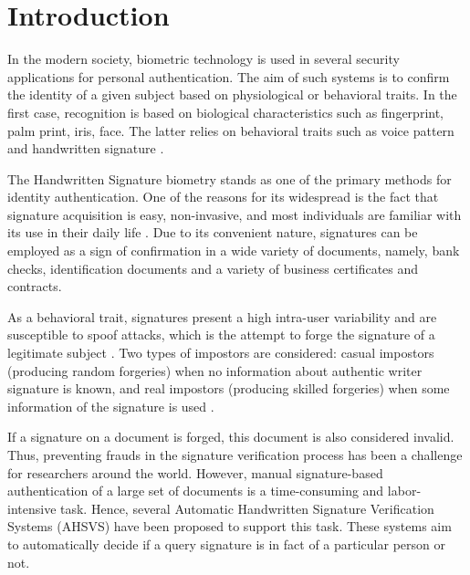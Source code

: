 
\chapter{Introduction}

In the modern society, biometric technology is used in several security applications for personal authentication. The aim of such systems is to confirm the identity of a given subject based on physiological or behavioral traits. In the first case, recognition is based on biological characteristics such as fingerprint, palm print, iris, face. The latter relies on behavioral traits such as voice pattern and handwritten signature \cite{jain2004biometrics}.

The Handwritten Signature biometry stands as one of the primary methods for identity authentication. One of the reasons for its widespread is the fact that signature acquisition is easy, non-invasive, and most individuals are familiar with its use in their daily life \cite{impedovo2008state}. Due to its convenient nature, signatures can be employed as a sign of confirmation in a wide variety of documents, namely, bank checks, identification documents and a variety of business certificates and contracts.

As a behavioral trait, signatures present a high intra-user variability and are susceptible to spoof attacks, which is the attempt to forge the signature of a legitimate subject \cite{jain2004biometrics}. Two types of impostors are considered: casual impostors (producing random forgeries) when no information about authentic writer signature is known, and real impostors (producing skilled forgeries) when some information of the signature is used \cite{fierrez2008handbook}.

If a signature on a document is forged, this document is also considered invalid. Thus, preventing frauds in the signature verification process has been a challenge for researchers around the world. However, manual signature-based authentication of a large set of documents is a time-consuming and labor-intensive task. Hence, several Automatic Handwritten Signature Verification Systems (AHSVS) have been proposed to support this task. These systems aim to automatically decide if a query signature is in fact of a particular person or not.


